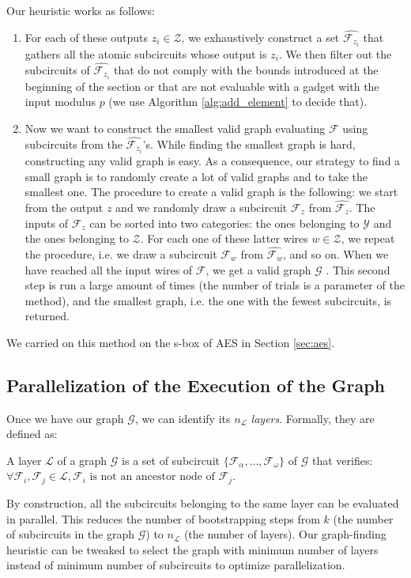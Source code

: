 Our heuristic works as follows:

\begin{enumerate}
    \item For each of these outputs $z_i \in \mathcal{Z}$, we exhaustively construct a set $\widehat{\mathcal{F}_{z_{i}}}$ that gathers all the atomic subcircuits whose output is $z_i$.
    We then filter out the subcircuits of $\widehat{\mathcal{F}_{z_{i}}}$ that do not comply with the bounds introduced at the beginning of the section or that are not evaluable with a gadget with the input modulus $p$ (we use Algorithm \ref{alg:add_element} to decide that).
    \medskip
    \item Now we want to construct the smallest valid graph evaluating $\mathcal{F}$ using subcircuits from the $\widehat{\mathcal{F}_{z_{i}}}$'s. While finding the smallest graph is hard, constructing any valid graph is easy. As a consequence, our strategy to find a small graph is to randomly create a lot of valid graphs and to take the smallest one. The procedure to create a valid graph is the following: we start from the output $z$ and we randomly draw a subcircuit $\mathcal{F}_z$ from $\widehat{\mathcal{F}_z}$. The inputs of $\mathcal{F}_z$ can be sorted into two categories: the ones belonging to $\mathcal{Y}$ and the ones belonging to $\mathcal{Z}$. For each one of these latter wires $w \in \mathcal{Z}$, we repeat the procedure, i.e. we draw a subcircuit $\mathcal{F}_w$ from $\widehat{\mathcal{F}_w}$, and so on. When we have reached all the input wires of $\mathcal{F}$, we get a valid graph $\mathcal{G}$ . This second step is run a large amount of times (the number of trials is a parameter of the method), and the smallest graph, i.e. the one with the fewest subcircuits, is returned.
\end{enumerate}

We carried on this method on the s-box of AES in Section \ref{sec:aes}.

\subsection{Parallelization of the Execution of the Graph}
\label{sec:parallelization}

Once we have our graph $\mathcal{G}$, we can identify its $n_\mathcal{L}$ \emph{layers}. Formally, they are defined as:

\begin{definition}
    A layer $\mathcal{L}$ of a graph $\mathcal{G}$ is a set of subcircuit $\{\mathcal {F}_\alpha, \dots, \mathcal{F}_\omega\}$ of $\mathcal{G}$ that verifies: $\forall \mathcal{F}_i, \mathcal{F}_j \in \mathcal{L}, \mathcal{F}_i \text{ is not an ancestor node of } \mathcal{F}_j.$    
\end{definition}

By construction, all the subcircuits belonging to the same layer can be evaluated in parallel. This reduces the number of bootstrapping steps from $k$ (the number of subcircuits in the graph $\mathcal{G}$) to $n_\mathcal{L}$ (the number of layers). Our graph-finding heuristic can be tweaked to select the graph with minimum number of layers instead of minimum number of subcircuits to optimize parallelization.
